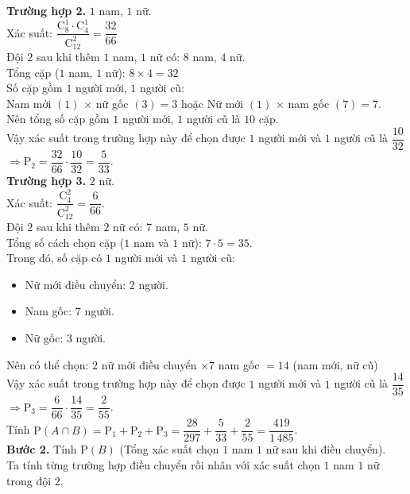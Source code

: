 \begin{bt}
{		\textbf{Trường hợp 2.} $1$ nam,  $1$ nữ.\\
		 Xác suất: $\dfrac{\mathrm{C}_8^1\cdot \mathrm{C}_4^1}{\mathrm{C}_{12}^2}=\dfrac{32}{66}$ \\
		Đội $2$ sau khi thêm $1$  nam, $1$ nữ có: $8$ nam, $4$ nữ.\\
		 Tổng cặp ($1$ nam, $1$ nữ): $8\times 4=32$ \\
		Số cặp gồm $1$ người mới, $1$ người  cũ: \\
		Nam mới $(1)$ × nữ gốc $(3) = 3$ hoặc Nữ mới $(1)$ × nam gốc $(7) =  7$.\\
		Nên tổng số cặp gồm $1$ người mới, $1$ người cũ là $10$ cặp.\\ 
		Vậy xác suất trong trường hợp này để chọn được $1$ người mới và $1$ người cũ là $\dfrac{10}{32}$  \\
		$\Rightarrow \mathrm{P}_{2}=\dfrac{32}{66}\cdot\dfrac{10}{32}=\dfrac{5}{33}$.\\ 
		\textbf{Trường  hợp 3.} $2$ nữ.\\
		Xác suất: $\dfrac{\mathrm{C}_4^2}{\mathrm{C}_{12}^2}=\dfrac{6}{66}$.\\ 
		Đội $2$ sau khi thêm $2$ nữ có:  $7$ nam, $5$ nữ.\\
		Tổng số cách chọn cặp ($1$ nam và $1$ nữ): $7\cdot  5=35$.\\
		Trong đó, số  cặp có $1$ người mới và $1$ người cũ:
		\begin{itemize}
			\item Nữ mới điều chuyển: $2$  người.
			\item Nam gốc:  $7$ người.
			\item Nữ gốc:  $3$ người.
		\end{itemize}
		Nên có thể chọn: $2$ nữ mới điều chuyển $\times  7$ nam gốc $=14$ (nam mới, nữ cũ)\\
		Vậy  xác suất trong trường hợp này để chọn được $1$ người mới và $1$ người cũ là $\dfrac{14}{35}$\\
		$\Rightarrow \mathrm{P}_3=\dfrac{6}{66}\cdot\dfrac{14}{35}=\dfrac{2}{55}$.\\ 
		Tính $\mathrm{P}(A\cap B)  =\mathrm{P}_1+\mathrm{P}_2+\mathrm{P}_3=\dfrac{28}{297}+\dfrac{5}{33}+\dfrac{2}{55}=\dfrac{419}{1\,485}$.\\
		\textbf{Bước 2.} Tính $\mathrm{P}(B)$ (Tổng  xác suất chọn $1$ nam $1$ nữ sau khi điều chuyển).\\
		Ta tính từng trường  hợp điều chuyển rồi nhân với xác suất chọn $1$ nam $1$ nữ trong đội $2$.\\
}
\end{bt}
